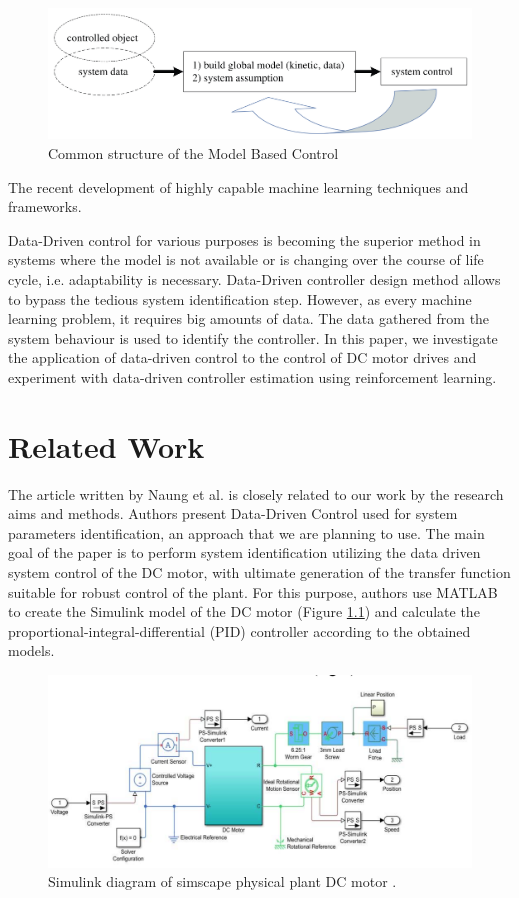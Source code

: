 \documentclass[]{final_report}
\begin{document}
\begin{figure} [h!]
\centerline{\includegraphics[width=.75\textwidth]{Screenshots for paper/1.png}}
\caption{Common structure of the Model Based Control \cite{hou2013model}}
\label{fig:mbcsctruct}
\end{figure}

The recent development of highly capable machine learning techniques and frameworks.

Data-Driven control for various purposes is becoming the superior method in systems where the model is not available or is changing over the course of life cycle, i.e. adaptability is necessary. Data-Driven controller design method allows to bypass the tedious system identification step. However, as every machine learning problem, it requires big amounts of data. The data gathered from the system behaviour is used to identify the controller. In this paper, we investigate the application of data-driven control to the control of DC motor drives and experiment with data-driven controller estimation using reinforcement learning.

\chapter{\label{chapter2} Related Work}


The article written by Naung et al. \cite{naung2018a} is closely related to our work by the research aims and methods. Authors present Data-Driven Control used for system parameters identification, an approach that we are planning to use. The main goal of the paper is to perform system identification utilizing the data driven system control of the DC motor, with ultimate generation of the transfer function suitable for robust control of the plant. For this purpose, authors use MATLAB to create the Simulink model of the DC motor (Figure \ref{fig:dcsimulink}) and calculate the proportional-integral-differential (PID) controller according to the obtained models.

\begin{figure} [h!]
\centerline{\includegraphics[width=.75\textwidth]{Screenshots for related work/1.png}}
\caption{Simulink diagram of simscape physical plant DC motor \cite{naung2018a}.}
\label{fig:dcsimulink}
\end{figure}
\end{document}

